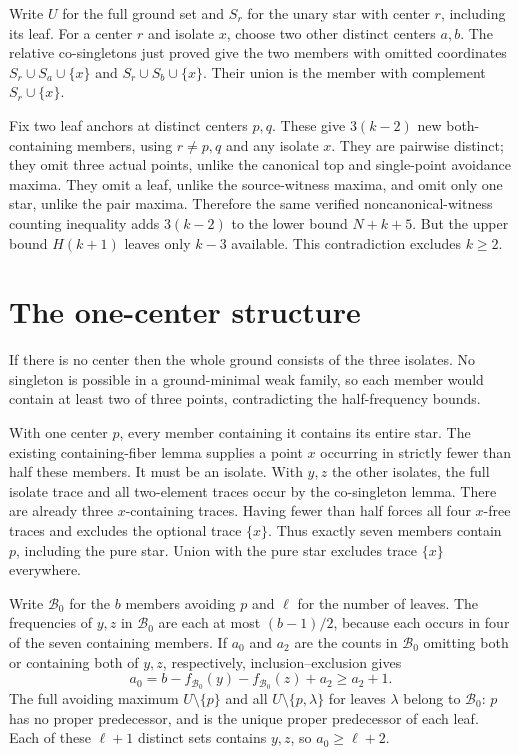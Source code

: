 \documentclass[11pt,letterpaper]{article}
\begin{document}
Write \(U\) for the full ground set and \(S_r\) for the unary
star with center \(r\), including its leaf. For a center \(r\) and
isolate \(x\), choose two other distinct centers \(a,b\).
The relative co-singletons just proved give the two members with
omitted coordinates \(S_r\cup S_a\cup\{x\}\) and
\(S_r\cup S_b\cup\{x\}\). Their union is the member with
complement \(S_r\cup\{x\}\).

Fix two leaf anchors at distinct centers \(p,q\). These give
\(3(k-2)\) new both-containing members, using \(r\ne p,q\)
and any isolate \(x\). They are pairwise distinct; they omit
three actual points, unlike the canonical top and single-point
avoidance maxima. They omit a leaf, unlike the source-witness
maxima, and omit only one star, unlike the pair maxima. Therefore
the same verified noncanonical-witness counting inequality adds
\(3(k-2)\) to the lower bound \(N+k+5\). But the upper bound
\(H(k+1)\) leaves only \(k-3\) available. This contradiction
excludes \(k\ge2\).

\section{The one-center structure}
If there is no center then the whole ground consists of the three
isolates. No singleton is possible in a ground-minimal weak
family, so each member would contain at least two of three
points, contradicting the half-frequency bounds.

With one center \(p\), every member containing it contains its
entire star. The existing containing-fiber lemma supplies a point
\(x\) occurring in strictly fewer than half these members. It must
be an isolate. With \(y,z\) the other isolates, the full isolate
trace and all two-element traces occur by the co-singleton lemma.
There are already three \(x\)-containing traces. Having fewer
than half forces all four \(x\)-free traces and excludes the
optional trace \(\{x\}\). Thus exactly seven members contain
\(p\), including the pure star. Union with the pure star
excludes trace \(\{x\}\) everywhere.

Write \(\mathcal B_0\) for the \(b\) members avoiding \(p\)
and \(\ell\) for the number of leaves. The frequencies of \(y,z\)
in \(\mathcal B_0\) are each at most \((b-1)/2\), because each
occurs in four of the seven containing members. If \(a_0\) and
\(a_2\) are the counts in \(\mathcal B_0\) omitting both or
containing both of \(y,z\), respectively, inclusion--exclusion gives
\[
    a_0=b-f_{\mathcal B_0}(y)-f_{\mathcal B_0}(z)+a_2
       \ge a_2+1.
\]
The full avoiding maximum \(U\setminus\{p\}\) and all
\(U\setminus\{p,\lambda\}\) for leaves \(\lambda\) belong to
\(\mathcal B_0\): \(p\) has no proper predecessor, and is the
unique proper predecessor of each leaf. Each of these \(\ell+1\)
distinct sets contains \(y,z\), so \(a_0\ge\ell+2\).
\end{document}
